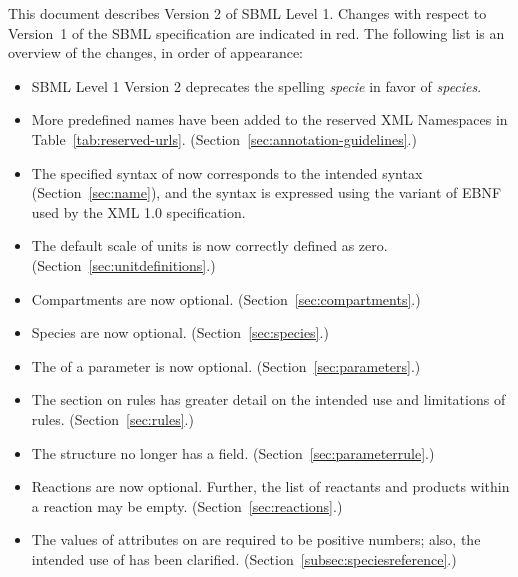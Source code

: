 \documentclass[10pt]{cekarticle}
\newenvironment{blockChanged}{\color{BrickRed}}{}
\begin{document}
\begin{blockChanged}
  This document describes Version 2 of SBML Level 1.  Changes with respect
  to Version~1 of the SBML specification are indicated in red.  The
  following list is an overview of the changes, in order of appearance:
\begin{itemize}\setlength{\parskip}{0.6ex}
  
\item SBML Level 1 Version 2 deprecates the spelling \emph{specie} 
  in favor of \emph{species}.
  
\item More predefined names have been added to the reserved XML Namespaces
      in Table~\ref{tab:reserved-urls}. (Section~\ref{sec:annotation-guidelines}.)

\item The specified syntax of  now corresponds to the intended
  syntax (Section~\ref{sec:name}), and the syntax is expressed using the
  variant of EBNF used by the XML 1.0 specification.

\item The default scale of units is now correctly defined as zero.
  (Section~\ref{sec:unitdefinitions}.)

\item Compartments are now optional.  (Section~\ref{sec:compartments}.)

\item Species are now optional.  (Section~\ref{sec:species}.)

\item The  of a parameter is now optional.
  (Section~\ref{sec:parameters}.)
  
\item The section on rules has greater detail on the intended use and
  limitations of rules.  (Section~\ref{sec:rules}.)
  
\item The  structure no longer has a  field.
  (Section~\ref{sec:parameterrule}.)
  
\item Reactions are now optional.  Further, the list of reactants and
  products within a reaction may be empty.  (Section~\ref{sec:reactions}.)
  
\item The values of attributes on  are required to
  be positive numbers; also, the intended use of 
  has been clarified.  (Section~\ref{subsec:speciesreference}.)


\end{itemize}
\end{blockChanged}
\end{document}
